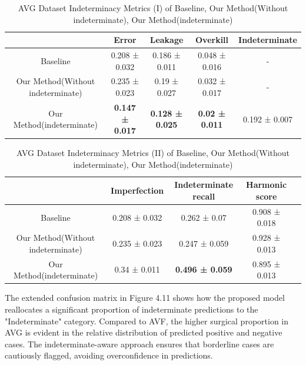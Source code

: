 \begin{table}[h]
\centering
\caption[AVG Dataset Indeterminacy Metrics (I) of Baseline, Our Method(Without indeterminate), Our Method(indeterminate)]{AVG Dataset Indeterminacy Metrics (I) of Baseline, Our Method(Without indeterminate), Our Method(indeterminate)}
\label{Indeterminacy Metrics(I) AVG}
\begin{tabular}{ccccc}
\toprule[1.1pt]
                      & Error & Leakage & Overkill & Indeterminate \\
\midrule[1.1pt]
\multirow{1}{*}{Baseline} & 0.208 ± 0.032 & 0.186 ± 0.011 & 0.048 ± 0.016 & - \\
\midrule
\multirow{1}{*}{Our Method(Without indeterminate)} & 0.235 ± 0.023 & 0.19 ± 0.027 & 0.032 ± 0.017 & - \\
\midrule
\multirow{1}{*}{Our Method(indeterminate)} & \textbf{0.147 ± 0.017} & \textbf{0.128 ± 0.025} & \textbf{0.02 ± 0.011} & 0.192 ± 0.007 \\

\bottomrule[1.1pt]
\end{tabular}
\end{table}

\begin{table}[H]
\centering
\caption[AVG Dataset Indeterminacy Metrics (II) of Baseline, Our Method(Without indeterminate), Our Method(indeterminate)]{AVG Dataset Indeterminacy Metrics (II) of Baseline, Our Method(Without indeterminate), Our Method(indeterminate)}
\label{Indeterminacy Metrics(II) AVG}
\begin{tabular}{ccccc}
\toprule[1.1pt]
                      & Imperfection & Indeterminate recall & Harmonic score \\
\midrule[1.1pt]
\multirow{1}{*}{Baseline} & 0.208 ± 0.032 & 0.262 ± 0.07 & 0.908 ± 0.018\\
\midrule
\multirow{1}{*}{Our Method(Without indeterminate)} & 0.235 ± 0.023 & 0.247 ± 0.059 & 0.928 ± 0.013 \\
\midrule
\multirow{1}{*}{Our Method(indeterminate)} & 0.34 ± 0.011 & \textbf{0.496 ± 0.059} & 0.895 ± 0.013 \\

\bottomrule[1.1pt]
\end{tabular}
\end{table}

The extended confusion matrix in Figure 4.11 shows how the proposed model reallocates a significant proportion of indeterminate predictions to the "Indeterminate" category. Compared to AVF, the higher surgical proportion in AVG is evident in the relative distribution of predicted positive and negative cases. The indeterminate-aware approach ensures that borderline cases are cautiously flagged, avoiding overconfidence in predictions.

